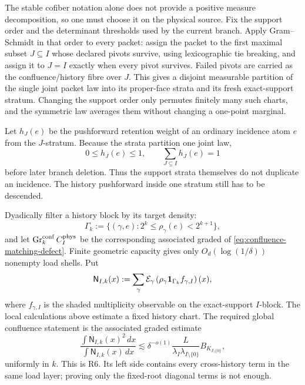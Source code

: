 \documentclass[11pt]{article}
\begin{document}
The stable cofiber notation alone does not provide a positive measure
decomposition, so one must choose it on the physical source.  Fix the support
order and the determinant thresholds used by the current branch.  Apply
Gram--Schmidt in that order to every packet: assign the packet to the first
maximal subset \(J\subseteq I\) whose declared pivots survive, using
lexicographic tie breaking, and assign it to \(J=I\) exactly when every pivot
survives.  Failed pivots are carried as the confluence/history fibre over
\(J\).  This gives a disjoint measurable partition of the single joint packet
law into its proper-face strata and its fresh exact-support stratum.  Changing
the support order only permutes finitely many such charts, and the symmetric
law averages them without changing a one-point marginal.

Let \(h_J(e)\) be the pushforward retention weight of an ordinary incidence
atom \(e\) from the \(J\)-stratum.  Because the strata partition one joint law,
\begin{equation}\label{eq:graded-source-partition}
 0\le h_J(e)\le1,
 \qquad
 \sum_{J\subseteq I}h_J(e)=1
\end{equation}
before later branch deletion.  Thus the support strata themselves do not
duplicate an incidence.  The history pushforward inside one stratum still has
to be descended.

Dyadically filter a history block by its target density:
\[
 \Gamma_k
 :=
 \{(\gamma,e):2^k\le\rho_\gamma(e)<2^{k+1}\},
\]
and let \(\operatorname{Gr}^{\rm conf}_k C_I^{\rm phys}\) be the corresponding
associated graded of \eqref{eq:confluence-matching-defect}.  Finite geometric
capacity gives only \(O_d(\log(1/\delta))\) nonempty load shells.  Put
\begin{equation}\label{eq:global-load-observable}
 \mathsf N_{I,k}(x)
 :=
 \sum_{\gamma}
 \mathcal E_\gamma
 \left(
 \rho_\gamma{\bf1}_{\Gamma_k} f_{\gamma,I}
 \right)(x),
\end{equation}
where \(f_{\gamma,I}\) is the shaded multiplicity observable on the
exact-support \(I\)-block.  The local calculations above estimate a fixed
history chart.  The required global confluence statement is the associated
graded estimate
\begin{equation}\label{eq:r6-confluence-energy-target}
 \boxed{
 \frac{\int \mathsf N_{I,k}(x)^2\,dx}
      {\int \mathsf N_{I,k}(x)\,dx}
 \lesssim
 \delta^{-o(1)}
 \frac{L}{\lambda_I\lambda_{I\setminus\{0\}}}
 B_{K_{I\setminus\{0\}}},}
\end{equation}
uniformly in \(k\).  This is R6.  Its left side contains every cross-history
term in the same load layer; proving only the fixed-root diagonal terms is not
enough.
\end{document}
